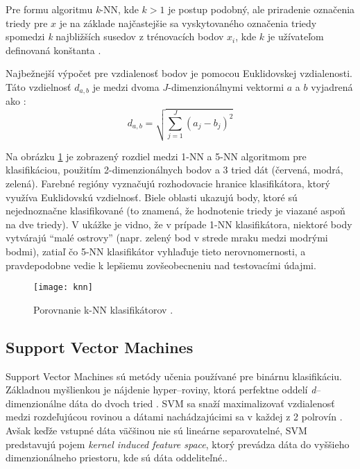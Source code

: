 Pre formu algoritmu \textit{k}-NN, kde $k > 1$ je postup podobný, ale priradenie označenia triedy pre $x$ je na základe najčastejšie sa vyskytovaného označenia triedy
spomedzi \textit{k} najbližších susedov z trénovacích bodov $x_i$, kde $k$ je užívateľom definovaná konštanta \cite{prop:KnnClassification}.

Najbežnejší výpočet pre vzdialenosť bodov je pomocou Euklidovskej vzdialenosti.
Táto vzdielnosť $d_{a,b}$ je medzi dvoma $J$-dimenzionálnymi vektormi $a$ a $b$ vyjadrená ako \cite{prop:KnnClassification}:
\begin{equation}
    \label{eq:euclidMetric}
    d_{a,b} = \sqrt{\sum_{j=1}^{J}{(a_j - b_j)^2}}
\end{equation}

Na obrázku \ref{pic:kNN} je zobrazený rozdiel medzi 1-NN a 5-NN algoritmom pre klasifikáciou,
    použitím 2-dimenzionálnych bodov a 3 tried dát (červená, modrá, zelená).
Farebné regióny vyznačujú rozhodovacie hranice klasifikátora, ktorý využíva Euklidovskú vzdielnosť.
Biele oblasti ukazujú body, ktoré sú nejednoznačne klasifikované (to znamená, že hodnotenie triedy je viazané aspoň na dve triedy).
V ukážke je vidno, že v prípade 1-NN klasifikátora, niektoré body vytvárajú ``malé ostrovy''
    (napr. zelený bod v strede mraku medzi modrými bodmi), zatiaľ čo 5-NN klasifikátor vyhlaďuje tieto nerovnomernosti,
    a pravdepodobne vedie k lepšiemu zovšeobecneniu nad testovacími údajmi.

\begin{figure}[H]
	\centering
	\texttt{[image: knn]}
	\caption{Porovnanie k-NN klasifikátorov \cite{odkaz:KnnImage}.}
	\label{pic:kNN}
\end{figure}



\subsection{Support Vector Machines}
Support Vector Machines sú metódy učenia používané pre binárnu klasifikáciu.
Základnou myšlienkou je nájdenie hyper--roviny, ktorá perfektne oddelí \textit{d}--dimenzionálne dáta do dvoch tried \cite{prop:IntroductionToSVM}.
SVM sa snaží maximalizovať vzdialenosť medzi rozdeľujúcou rovinou a dátami nachádzajúcimi sa v každej z 2 polrovín \cite{prop:SupervisedMachineLearning}.
Avšak keďže vstupné dáta väčšinou nie sú lineárne separovatelné, SVM predstavujú pojem \textit{kernel induced feature space},
    ktorý prevádza dáta do vyššieho dimenzionálneho priestoru, kde sú dáta oddeliteľné.\cite{prop:IntroductionToSVM}.

